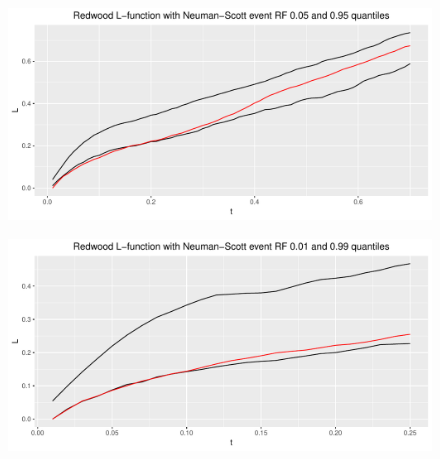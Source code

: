 \begin{figure}
    \centering
    \includegraphics[scale=0.95]{figures/ns_quant1.pdf}
    \caption{}
    \label{fig:ns_quant1}
\end{figure}
\begin{figure}
    \centering
    \includegraphics[scale=0.95]{figures/ns_quant2.pdf}
    \caption{}
    \label{fig:ns_quant2}
\end{figure}